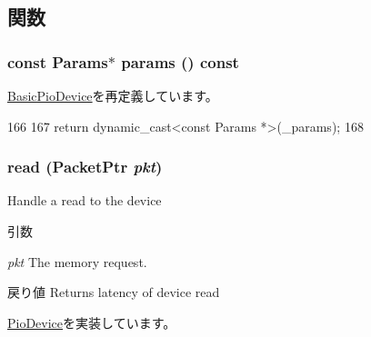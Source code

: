 \subsection{関数}
\hypertarget{classCpuLocalTimer_acd3c3feb78ae7a8f88fe0f110a718dff}{
\subsubsection[{params}]{\setlength{\rightskip}{0pt plus 5cm}const {\bf Params}$\ast$ params () const}}
\label{classCpuLocalTimer_acd3c3feb78ae7a8f88fe0f110a718dff}


\hyperlink{classBasicPioDevice_acd3c3feb78ae7a8f88fe0f110a718dff}{BasicPioDevice}を再定義しています。


\begin{DoxyCode}
166     {
167         return dynamic_cast<const Params *>(_params);
168     }
\end{DoxyCode}
\hypertarget{classCpuLocalTimer_a613ec7d5e1ec64f8d21fec78ae8e568e}{
\subsubsection[{read}]{ read ({\bf PacketPtr} {\em pkt})}}
\label{classCpuLocalTimer_a613ec7d5e1ec64f8d21fec78ae8e568e}
Handle a read to the device 
\begin{DoxyParams}{引数}
\item[{\em pkt}]The memory request. \end{DoxyParams}
\begin{DoxyReturn}{戻り値}
Returns latency of device read 
\end{DoxyReturn}


\hyperlink{classPioDevice_a842312590432036092c422c87a442358}{PioDevice}を実装しています。


